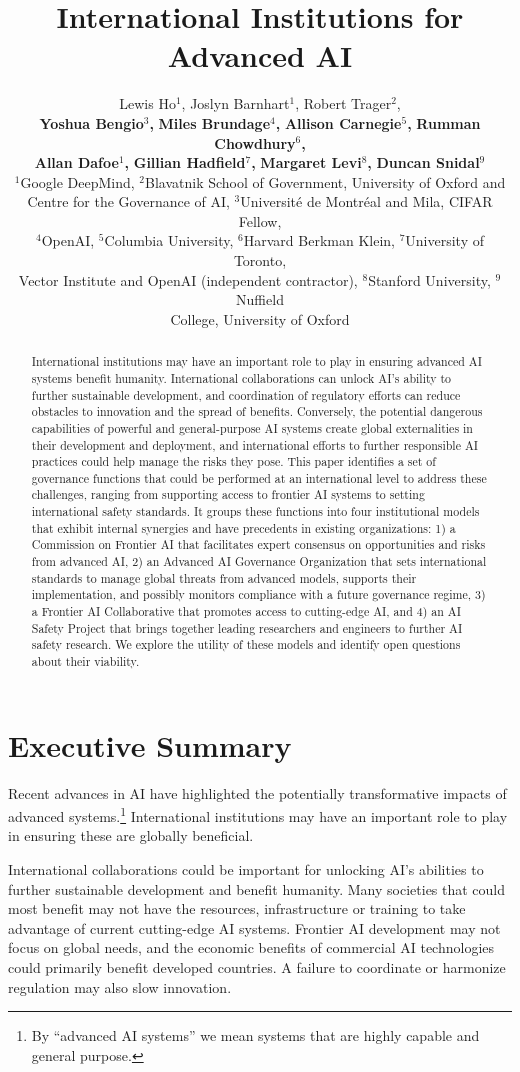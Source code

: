 \documentclass[12pt]{article}
\title{International Institutions for Advanced AI}
\author{
Lewis Ho$^1$, 
Joslyn Barnhart$^1$,
Robert Trager$^2$,\\
\textbf{Yoshua Bengio$^3$,}
\textbf{Miles Brundage$^4$,}
\textbf{Allison Carnegie$^5$,}
\textbf{Rumman Chowdhury$^6$,}\\
\textbf{Allan Dafoe$^1$,}
\textbf{Gillian Hadfield$^7$,} 
\textbf{Margaret Levi$^8$,}
\textbf{Duncan Snidal$^9$} \vspace{10pt}\\
 $^1$Google DeepMind, $^2$Blavatnik School of Government, University of Oxford and\\
 Centre for the Governance of AI, $^3$Universit\'{e} de Montr\'{e}al and Mila, CIFAR Fellow,\\
 $^4$OpenAI, 
 $^5$Columbia University,
 $^6$Harvard Berkman Klein,
 $^7$University of Toronto,\\ Vector Institute and OpenAI (independent contractor),
 $^8$Stanford University,
 $^9$Nuffield\\ College, University of Oxford
 }
\begin{document}
\maketitle

\begin{abstract}
International institutions may have an important role to play in
ensuring advanced AI systems benefit humanity. International
collaborations can unlock AI's ability to further sustainable
development, and coordination of regulatory efforts can reduce obstacles
to innovation and the spread of benefits. Conversely, the potential
dangerous capabilities of powerful and general-purpose AI systems
create global externalities in their development and deployment, and
international efforts to further responsible AI practices could help
manage the risks they pose. This paper identifies a set of governance
functions that could be performed at an international level to address
these challenges, ranging from supporting access to frontier AI systems
to setting international safety standards. It groups these functions
into four institutional models that exhibit internal synergies and have
precedents in existing organizations: 1) a Commission on Frontier AI
that facilitates expert consensus on opportunities and risks from
advanced AI, 2) an Advanced AI Governance Organization that sets
international standards to manage global threats from advanced models,
supports their implementation, and possibly monitors compliance with a
future governance regime, 3) a Frontier AI Collaborative that promotes
access to cutting-edge AI, and 4) an AI Safety Project that brings
together leading researchers and engineers to further AI
safety research. We explore the utility of these models and identify
open questions about their viability.
\end{abstract}

\section*{Executive Summary}

Recent advances in AI have highlighted the potentially transformative
impacts of advanced systems.\footnote{By ``advanced AI systems'' we mean systems that are
  highly capable and general purpose.}
  International institutions may have an
important role to play in ensuring these are globally beneficial.

International collaborations could be important for unlocking AI's
abilities to further sustainable development and benefit humanity. Many
societies that could most benefit may not have the resources,
infrastructure or training to take advantage of current cutting-edge AI
systems. Frontier AI development may not focus on global needs, and the
economic benefits of commercial AI technologies could primarily benefit
developed countries. A failure to coordinate or harmonize regulation may
also slow innovation.
\end{document}
